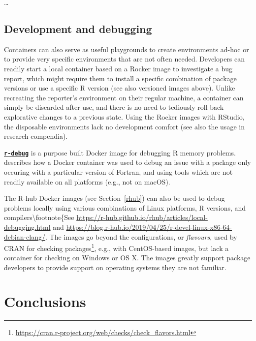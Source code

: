 \ldots{}

\hypertarget{development-and-debugging}{%
\subsection{Development and debugging}\label{development-and-debugging}}

\label{development}

Containers can also serve as useful playgrounds to create environments
ad-hoc or to provide very specific environments that are not often
needed. Developers can readily start a local container based on a Rocker
image to investigate a bug report, which might require them to install a
specific combination of package versions or use a specific R version
(see also versioned images above). Unlike recreating the reporter's
environment on their regular machine, a container can simply be
discarded after use, and there is no need to tediously roll back
explorative changes to a previous state. Using the Rocker images with
RStudio, the disposable environments lack no development comfort (see
also the usage in research compendia).

\textbf{\href{https://github.com/wch/r-debug}{\texttt{r-debug}}} is a
purpose built Docker image for debugging R memory problems.
\citet{eddelbuettel_debugging_2019} describes how a Docker container was
used to debug an issue with a package only occuring with a particular
version of Fortran, and using tools which are not readily available on
all platforms (e.g., not on macOS).

The R-hub Docker images (see Section~\ref{rhub}) can also be used to
debug problems locally using various combinations of Linux platforms, R
versions, and compilers\textbackslash{}footnote\{See
\href{https://r-hub.github.io/rhub/articles/local-debugging.html}{https://r-hub.github.io/rhub/articles/local-debugging.html}
and
\href{https://blog.r-hub.io/2019/04/25/r-devel-linux-x86-64-debian-clang/}{https://blog.r-hub.io/2019/04/25/r-devel-linux-x86-64-debian-clang/}.
The images go beyond the configurations, or \emph{flavours}, used by
CRAN for checking
packages\footnote{\href{https://cran.r-project.org/web/checks/check_flavors.html}{https://cran.r-project.org/web/checks/check\_flavors.html}},
e.g., with CentOS-based images, but lack a container for checking on
Windows or OS X. The images greatly support package developers to
provide support on operating systems they are not familiar.

\hypertarget{conclusions}{%
\section{Conclusions}\label{conclusions}}

